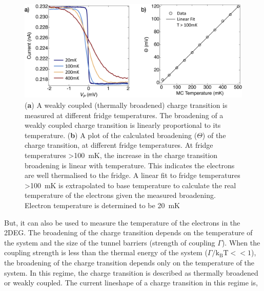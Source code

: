 \begin{figure}[!htb]
 \begin{center}
  \includegraphics[width=1.0\textwidth]{figures/ch1/crop_FiguresMaster.007.png}
  \caption[Calculating the electron temperature]{\label{fig:ch1/electron_temp} 
  (\textbf{a}) A weakly coupled (thermally broadened) charge transition is measured at different fridge temperatures. The broadening of a weakly coupled charge transition is linearly proportional to its temperature. (\textbf{b}) A plot of the calculated broadening ($\Theta$) of the charge transition, at different fridge temperatures. At fridge temperatures \qty{>100}{mK}, the increase in the charge transition broadening is linear with temperature. This indicates the electrons are well thermalised to the fridge. A linear fit to fridge temperatures \qty{>100}{mK} is extrapolated to base temperature to calculate the real temperature of the electrons given the measured broadening. Electron temperature is determined to be \qty{20}{mK}
   }
 \end{center}
\end{figure}



But, it can also be used to measure the temperature of the electrons in the 2DEG. The broadening of the charge transition depends on the temperature of the system and the size of the tunnel barriers (strength of coupling $\Gamma$). When the coupling strength is less than the thermal energy of the system ($\Gamma/\mathrm{k_BT} << 1$), the broadening of the charge transition depends only on the temperature of the system. In this regime, the charge transition is described as thermally broadened or weakly coupled. The current lineshape of a charge transition in this regime is,


